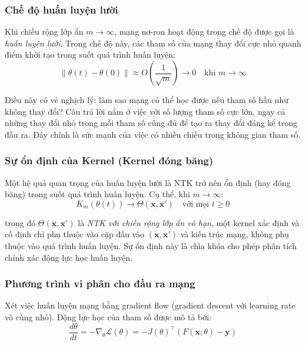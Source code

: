 \subsubsection{Chế độ huấn luyện lười}

Khi chiều rộng lớp ẩn $m \rightarrow \infty$, mạng nơ-ron hoạt động trong chế độ được gọi là \textit{huấn luyện lười}. Trong chế độ này, các tham số của mạng thay đổi cực nhỏ quanh điểm khởi tạo trong suốt quá trình huấn luyện:
\begin{equation}
    \|\theta(t) - \theta(0)\| \approx O\left(\frac{1}{\sqrt{m}}\right) \rightarrow 0 \quad \text{khi } m \rightarrow \infty
\end{equation}

Điều này có vẻ nghịch lý: làm sao mạng có thể học được nếu tham số hầu như không thay đổi? Câu trả lời nằm ở việc với số lượng tham số cực lớn, ngay cả những thay đổi nhỏ trong mỗi tham số cũng đủ để tạo ra thay đổi đáng kể trong đầu ra. Đây chính là sức mạnh của việc có nhiều chiều trong không gian tham số.

\subsubsection{Sự ổn định của Kernel (Kernel đóng băng)}

Một hệ quả quan trọng của huấn luyện lười là NTK trở nên ổn định (hay đóng băng) trong suốt quá trình huấn luyện. Cụ thể, khi $m \rightarrow \infty$:
\begin{equation}
    K_m(\theta(t)) \rightarrow \Theta(\mathbf{x}, \mathbf{x}') \quad \text{với mọi } t \geq 0
\end{equation}

trong đó $\Theta(\mathbf{x}, \mathbf{x}')$ là \textit{NTK với chiều rộng lớp ẩn vô hạn}, một kernel xác định và cố định chỉ phụ thuộc vào cặp đầu vào $(\mathbf{x}, \mathbf{x}')$ và kiến trúc mạng, không phụ thuộc vào quá trình huấn luyện. Sự ổn định này là chìa khóa cho phép phân tích chính xác động lực học huấn luyện.

\subsubsection{Phương trình vi phân cho đầu ra mạng}

Xét việc huấn luyện mạng bằng gradient flow (gradient descent với learning rate vô cùng nhỏ). Động lực học của tham số được mô tả bởi:
\begin{equation}
    \frac{d\theta}{dt} = -\nabla_\theta \mathcal{L}(\theta) = -J(\theta)^\top (F(\mathbf{x}; \theta) - \mathbf{y})
\end{equation}

